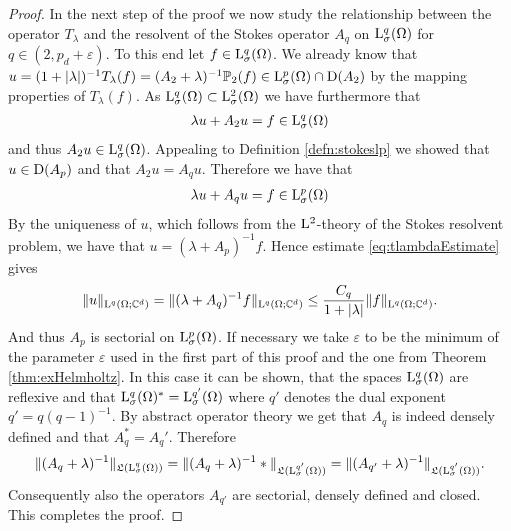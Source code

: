 \begin{proof}
  In the next step of the proof we now study the relationship between the operator $T_\lambda$ and the resolvent of the Stokes operator $A_q$ on $\mathrm{L}^q_\sigma(\Omega)$ for $q \in (2, p_d + \varepsilon)$.
  To this end let $f \in \mathrm{L}^q_\sigma(\Omega)$.
  We already know that $u = (1 + |\lambda|)^{-1} T_\lambda(f) = (A_2 + \lambda)^{-1} \mathbb{P}_2(f) \in \mathrm{L}^p_\sigma(\Omega) \cap \mathrm{D}(A_2)$  by the mapping properties of $T_\lambda(f)$. As $\mathrm{L}^q_\sigma(\Omega) \subset \mathrm{L}^2_\sigma(\Omega)$ we have furthermore that
  \begin{align*}
    \lambda u + A_2 u = f \in \mathrm{L}^q_\sigma(\Omega)
  \end{align*}
  and thus $A_2 u \in \mathrm{L}^q_\sigma(\Omega)$.
  Appealing to Definition \ref{defn:stokeslp} we showed that $u \in \mathrm{D}(A_p)$ and that $A_2u = A_q u$. 
  Therefore we have that
  \begin{align*}
    \lambda u + A_q u = f \in \mathrm{L}^p_\sigma(\Omega)
  \end{align*}
  By the uniqueness of $u$, which follows from the $\mathrm{L}^2$-theory of the Stokes resolvent problem, we have that $u = (\lambda + A_p)^{-1} f$.
  Hence estimate \ref{eq:tlambdaEstimate} gives
  \begin{align*}
    \|u\|_{\mathrm{L}^q(\Omega; \mathbb{C}^d)} = \|(\lambda + A_q)^{-1}f \|_{\mathrm{L}^q(\Omega; \mathbb{C}^d)}
    \leq \frac{C_q}{ 1 + |\lambda|} \|f\|_{\mathrm{L}^q(\Omega; \mathbb{C}^d)}.
  \end{align*}
  And thus $A_p$ is sectorial on $\mathrm{L}^p_\sigma(\Omega)$.
  If necessary we take $\varepsilon$ to be the minimum of the parameter $\varepsilon$ used in the first part of this proof and the one from Theorem \ref{thm:exHelmholtz}.
  In this case it can be shown, that the spaces $\mathrm{L}^q_\sigma(\Omega)$ are reflexive and that $\mathrm{L}^q_\sigma(\Omega)^* = \mathrm{L}^{q'}_\sigma(\Omega)$ where $q'$ denotes the dual exponent $q' = q (q - 1)^{-1}$.
  By abstract operator theory \cite{Marcus Haase} we get that $A_q$ is indeed densely defined and that $A_q^* =  A_q'$.
  Therefore
  \begin{align*}
    \| (A_q + \lambda)^{-1} \|_{\mathfrak{L}(\mathrm{L}^q_\sigma(\Omega))}
    = \| (A_q + \lambda)^{-1}* \|_{\mathfrak{L}(\mathrm{L}^{q'}_\sigma(\Omega))}
    = \| (A_{q'} + \lambda)^{-1} \|_{\mathfrak{L}(\mathrm{L}^{q'}_\sigma(\Omega))}.
  \end{align*}
  Consequently also the operators $A_{q'}$ are sectorial, densely defined and closed.
  This completes the proof.
\end{proof}
